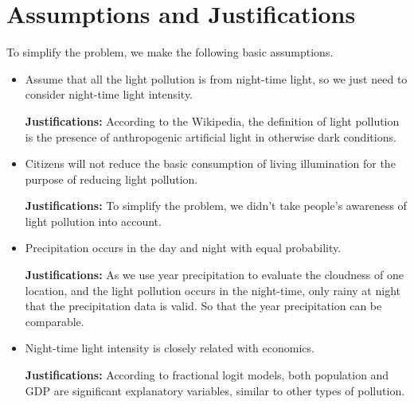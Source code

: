 \MinParskip{}
\section{Assumptions and Justifications} 
To simplify the problem, we make the following basic assumptions.

\begin{itemize}
    \item Assume that all the light pollution is from night-time light, so we just need to consider night-time light intensity.  

    \textbf{Justifications: }According to the Wikipedia\cite{wiki}, the definition of light pollution is the presence of anthropogenic artificial light in otherwise dark conditions. 

    \item Citizens will not reduce the basic consumption of living illumination for the purpose of reducing light pollution.
    
    \textbf{Justifications: }To simplify the problem, we didn't take people's awareness of light pollution into account.

    \item Precipitation occurs in the day and night with equal probability.
    
    \textbf{Justifications: }As we use year precipitation to evaluate the cloudness of one location, and the light pollution occurs in the night-time, only rainy at night that the precipitation data is valid. So that the year precipitation can be comparable.

    \item Night-time light intensity is closely related with economics.
    
    \textbf{Justifications: }According to fractional logit models\cite{GALLAWAY2010658}, both population and GDP are significant explanatory variables, similar to other types of pollution. 
\end{itemize}

